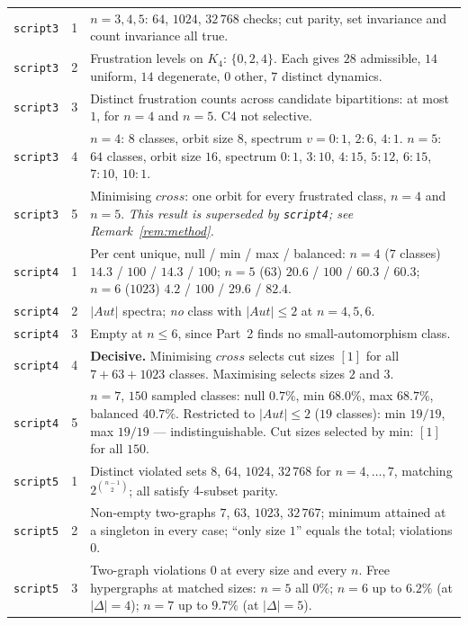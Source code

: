 \documentclass[11pt,a4paper]{article}
\def\mathrm#1{#1}%
\newcommand{\Kfour}{K_4}
\newcommand{\Aut}{\mathrm{Aut}}
\newcommand{\cross}{\mathrm{cross}}
\begin{document}
\begin{longtable}{p{2.1cm}p{2.0cm}p{9.8cm}}
\midrule
\texttt{script3} & 1 & $n=3,4,5$: $64$, $1024$, $32\,768$ checks; cut parity, set invariance and count invariance all true. \\
\texttt{script3} & 2 & Frustration levels on $\Kfour$: $\{0,2,4\}$. Each gives $28$ admissible, $14$ uniform, $14$ degenerate, $0$ other, $7$ distinct dynamics. \\
\texttt{script3} & 3 & Distinct frustration counts across candidate bipartitions: at most $1$, for $n=4$ and $n=5$. C4 not selective. \\
\texttt{script3} & 4 & $n=4$: $8$ classes, orbit size $8$, spectrum $v{=}0{:}1$, $2{:}6$, $4{:}1$. $n=5$: $64$ classes, orbit size $16$, spectrum $0{:}1$, $3{:}10$, $4{:}15$, $5{:}12$, $6{:}15$, $7{:}10$, $10{:}1$. \\
\texttt{script3} & 5 & Minimising $\cross$: one orbit for every frustrated class, $n=4$ and $n=5$. \emph{This result is superseded by \texttt{script4}; see Remark~\ref{rem:method}.} \\
\midrule
\texttt{script4} & 1 & Per cent unique, null / min / max / balanced: $n=4$ ($7$ classes) $14.3$ / $100$ / $14.3$ / $100$; $n=5$ ($63$) $20.6$ / $100$ / $60.3$ / $60.3$; $n=6$ ($1023$) $4.2$ / $100$ / $29.6$ / $82.4$. \\
\texttt{script4} & 2 & $|\Aut|$ spectra; \emph{no} class with $|\Aut|\le2$ at $n=4,5,6$. \\
\texttt{script4} & 3 & Empty at $n\le6$, since Part~2 finds no small-automorphism class. \\
\texttt{script4} & 4 & \textbf{Decisive.} Minimising $\cross$ selects cut sizes $[1]$ for all $7+63+1023$ classes. Maximising selects sizes $2$ and $3$. \\
\texttt{script4} & 5 & $n=7$, $150$ sampled classes: null $0.7\%$, min $68.0\%$, max $68.7\%$, balanced $40.7\%$. Restricted to $|\Aut|\le2$ ($19$ classes): min $19/19$, max $19/19$ --- indistinguishable. Cut sizes selected by min: $[1]$ for all $150$. \\
\midrule
\texttt{script5} & 1 & Distinct violated sets $8$, $64$, $1024$, $32\,768$ for $n=4,\dots,7$, matching $2^{\binom{n-1}{2}}$; all satisfy $4$-subset parity. \\
\texttt{script5} & 2 & Non-empty two-graphs $7$, $63$, $1023$, $32\,767$; minimum attained at a singleton in every case; ``only size $1$'' equals the total; violations $0$. \\
\texttt{script5} & 3 & Two-graph violations $0$ at every size and every $n$. Free hypergraphs at matched sizes: $n=5$ all $0\%$; $n=6$ up to $6.2\%$ (at $|\Delta|=4$); $n=7$ up to $9.7\%$ (at $|\Delta|=5$). \\

\end{longtable}
\end{document}
